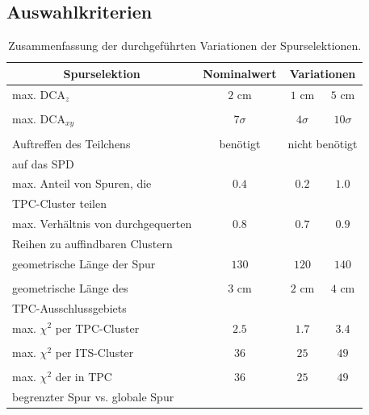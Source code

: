 \documentclass[12pt,a4paper]{report}
\begin{document}
\subsection{Auswahlkriterien}
\begin{table}[H]
\centering
\begin{tabular}{|l c c c|}
\hline
 \multicolumn{1}{c}{\textbf{Spurselektion}} & \multicolumn{1}{c}{\textbf{Nominalwert}} & \multicolumn{2}{c|}{\textbf{Variationen}}\\
\hline
\hline
 max. $\mathrm{DCA}_{z}$ & $2$ cm & $1$ cm & $5$ cm\\
\rowcolor{mygray}   & & &\\

max. $\mathrm{DCA}_{xy}$ & $7\sigma$ & $4\sigma$ & $10\sigma$\\
  & & &\\
 
\rowcolor{mygray}  Auftreffen des Teilchens & benötigt  & \multicolumn{2}{c|}{nicht benötigt}\\
\rowcolor{mygray}  auf das SPD & & \multicolumn{2}{c|}{ }\\


max. Anteil von Spuren, die & $0.4$ & $0.2$ & $1.0$\\
  TPC-Cluster teilen & & &\\


\rowcolor{mygray}  max. Verhältnis von durchgequerten & $0.8$ & $0.7$ & $0.9$\\
\rowcolor{mygray}     Reihen zu auffindbaren Clustern & & &\\

 geometrische Länge der Spur & $130$ & $120$ & $140$\\
  & & &\\

\rowcolor{mygray}  geometrische Länge des & $3$ cm & $2$ cm & $4$ cm\\
\rowcolor{mygray}   TPC-Ausschlussgebiets & & &\\

 max. $\chi^2$ per TPC-Cluster & $2.5$ & $1.7$ & $3.4$\\
 & & & \\

\rowcolor{mygray}  max. $\chi^2$ per ITS-Cluster  & $36$ & $25$ & $49$\\
\rowcolor{mygray}  & & &\\

 max. $\chi^2$ der in TPC  & $36$ & $25$ & $49$\\
 begrenzter Spur vs. globale Spur & & &\\
\hline
\end{tabular}
\caption{Zusammenfassung der durchgeführten Variationen der Spurselektionen.}
\label{tab:CutsVariation}
\end{table}
\end{document}
